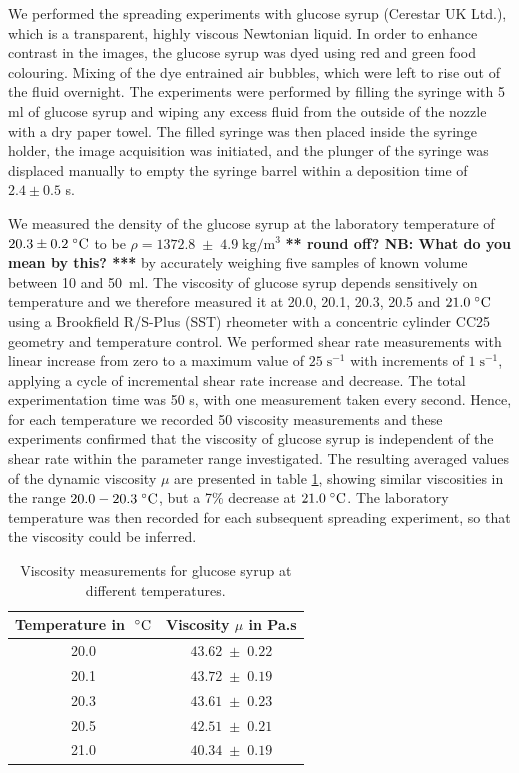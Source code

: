 \documentclass[aip,graphicx]{revtex4-1}
\newcommand{\sym}[1]{\text{#1}} \newcommand{\dif}{\mathrm{d}}
\begin{document}
We performed the spreading experiments with glucose syrup 
(Cerestar UK Ltd.), which is a transparent, highly viscous Newtonian
liquid. In order to enhance contrast in the images, the glucose syrup
was dyed using red and green food colouring.  Mixing of the dye
entrained air bubbles, which were left to rise out of the fluid
overnight. The experiments were performed by filling the syringe with
5 ml of glucose syrup and wiping any excess fluid from the outside of
the nozzle with a dry paper towel. The filled syringe was then placed
inside the syringe holder, the image acquisition was initiated, and
the plunger of the syringe was displaced manually to empty the
syringe barrel within a deposition time of $2.4 \pm 0.5$ s.

We measured the density of the glucose syrup at the laboratory temperature
of $20.3 \pm 0.2 \; ^{\circ} \text{C}$ to be $\rho=1372.8 \; \pm \; 4.9 \;
\sym{kg}/\sym{m}^3$ {\bf *** round off? NB: What do you mean by this? ***}  by accurately weighing five samples of known
volume between 10 and 50~ml.  The viscosity of glucose syrup depends
sensitively on temperature \cite{llewellin2002rheology} and we
therefore measured it at 20.0, 20.1, 20.3, 20.5 and $21.0 \; ^{\circ} \text{C}$
using a Brookfield R/S-Plus (SST) rheometer with a concentric cylinder
CC25 geometry and temperature control. We performed shear rate
measurements with linear increase from zero to a maximum value of $25
\; \sym{s}^{-1}$ with increments of $1 \; \sym{s}^{-1}$, applying a
cycle of incremental shear rate increase and decrease.  The total
experimentation time was 50 s, with one measurement taken every
second. Hence, for each temperature we recorded 50 viscosity
measurements and these experiments confirmed that the viscosity of
glucose syrup is independent of the shear rate 
within the parameter range investigated. The resulting
averaged values of the dynamic viscosity $\mu$ are presented in table
\ref{tab:glucose_viscosity}, showing similar viscosities in the range
$20.0 - 20.3 \; ^{\circ} \text{C}$, but a 7\% decrease at $21.0 \; ^{\circ} \text{C}$. The
laboratory temperature was then recorded for each subsequent 
spreading experiment, so that the viscosity could be inferred. 


{\renewcommand{\arraystretch}{1.2}
 \begin{table}[!ht]
 \begin{center}
 \begin{tabular}{c | c}
  Temperature in $\; ^{\circ} \text{C}$ & Viscosity $\mu$ in Pa.s \\ \hline 20.0 &
  $43.62 \; \pm \; 0.22$ \\ 20.1 & $43.72 \; \pm \; 0.19$ \\ 20.3 &
  $43.61 \; \pm \; 0.23$ \\ 20.5 & $42.51 \; \pm \; 0.21$ \\ 21.0 &
  $40.34 \; \pm \; 0.19$\\
 \end{tabular}
 \caption{Viscosity measurements for glucose syrup at different
   temperatures.}
 \label{tab:glucose_viscosity}
 \end{center}
 \end{table}}
\end{document}
